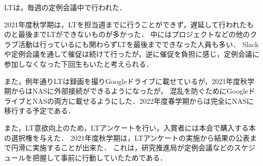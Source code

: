 LTは，毎週の定例会議中で行われた．

2021年度秋学期は，LTを担当週までに行うことができず，遅延して行われたものと最後までLTができないものが多かった．
中にはプロジェクトなどの他のクラブ活動は行っているにも関わらずLTを最後までできなった人員も多い．
Slackや定例会議を通して催促は続けて行ったが，逆に催促を負担に感じ，定例会議に参加しなくなった下回生もいたと考えられる．

また，例年通りLTは録画を撮りGoogleドライブに載せているが，2021年度秋学期からはNASに外部接続ができるようになったが，
混乱を防ぐためにGoogleドライブとNASの両方に載せるようにした．2022年度春学期からは完全にNASに移行する予定である．

また，LT意欲向上のため，LTアンケートを行い，入賞者には本会で購入する本の選択権を与えた．
2021年度秋学期は，LTアンケートの実施から結果の公表まで円滑に実施することが出来た．
これは，研究推進局が定例会議などのスケジュールを把握して事前に行動していたためである．

